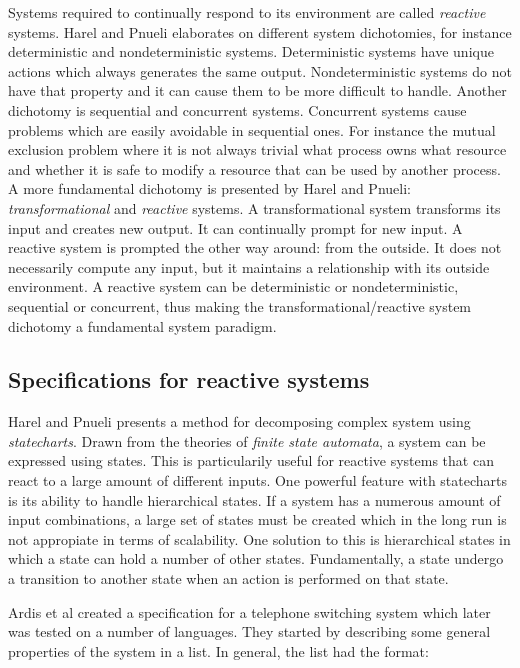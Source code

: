 Systems required to continually respond to its environment are called
\textit{reactive} systems. Harel and Pnueli \cite{harel1985development}
elaborates on different system dichotomies, for instance deterministic and
nondeterministic systems. Deterministic systems have unique actions which
always generates the same output. Nondeterministic systems do not have that
property and it can cause them to be more difficult to handle. Another
dichotomy is sequential and concurrent systems. Concurrent systems cause
problems which are easily avoidable in sequential ones. For instance the mutual
exclusion problem where it is not always trivial what process owns what
resource and whether it is safe to modify a resource that can be used by
another process. A more fundamental dichotomy is presented by Harel and Pnueli:
\textit{transformational} and \textit{reactive} systems. A transformational
system transforms its input and creates new output. It can continually prompt
for new input. A reactive system is prompted the other way around: from the
outside. It does not necessarily compute any input, but it maintains a
relationship with its outside environment. A reactive system can be
deterministic or nondeterministic, sequential or concurrent, thus making the
transformational/reactive system dichotomy a fundamental system paradigm.
\cite{harel1985development}

\subsection{Specifications for reactive systems}

Harel and Pnueli \cite{harel1985development} presents a method for decomposing
complex system using \textit{statecharts}. Drawn from the theories of
\textit{finite state automata}, a system can be expressed using states. This is
particularily useful for reactive systems that can react to a large amount of
different inputs. One powerful feature with statecharts is its ability to
handle hierarchical states. If a system has a numerous amount of input
combinations, a large set of states must be created which in the long run is
not appropiate in terms of scalability. One solution to this is hierarchical
states in which a state can hold a number of other states. Fundamentally, a
state undergo a transition to another state when an action is performed on that
state. \cite{harel1985development}

Ardis et al \cite{ardis1996framework} created a specification for a telephone
switching system which later was tested on a number of languages. They started
by describing some general properties of the system in a list. In general, the
list had the format:

